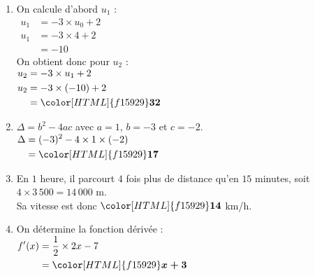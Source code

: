 \documentclass[a4paper,11pt,landscape,exos]{nsi} %
\begin{document}
\begin{multicols}{2}
\begin{enumerate}[itemsep=1em]
    \item On calcule d'abord $u_1$ : \\   
          $\begin{aligned}
          u_1&=-3\times u_0 +2\\
          u_1&=-3\times 4 +2\\
          &=-10     
          \end{aligned}$\\
          On obtient donc pour $u_2$ :\\
          $\begin{aligned}
          u_2&=-3\times u_1 +2\\
          u_2&=-3\times (-10) +2\\
          &={\color[HTML]{f15929}\boldsymbol{32}}     
          \end{aligned}$
    \item  $\Delta=b^2-4ac$ avec $a=1$, $b=-3$ et $c=-2$.\\
          $\begin{aligned}
          \Delta&=(-3)^2-4\times 1\times (-2) \\
          &={\color[HTML]{f15929}\boldsymbol{17}} 
          \end{aligned}$
    \item En $1$ heure, il parcourt $4$ fois plus de distance  qu'en $15$ minutes, soit $4\times 3\,500=
          14\,000$ m.\\
          Sa vitesse est donc ${\color[HTML]{f15929}\boldsymbol{14}}$ km/h.
    \item  On détermine la fonction dérivée :\\
          $\begin{aligned}
          f'(x)&=\dfrac{1}{2}\times 2x -7\\
          &={\color[HTML]{f15929}\boldsymbol{x+3}}     
          \end{aligned}$
      

\end{enumerate}
\end{multicols}
\end{document}
